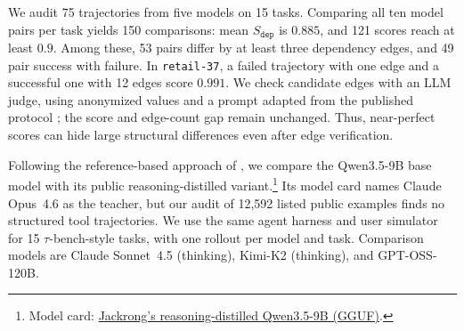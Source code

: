 We audit 75 trajectories from five models on 15 tasks. Comparing all ten
model pairs per task yields 150 comparisons: mean $S_{\mathtt{dep}}$ is
$0.885$, and 121 scores reach at least $0.9$. Among these, 53 pairs differ by at
least three dependency edges, and 49 pair success with failure. In
\texttt{retail-37}, a failed trajectory with one edge and a successful one
with 12 edges score $0.991$. We check candidate edges with an LLM judge,
using anonymized values and a prompt adapted from the published protocol
\citep[Appendix~B.1]{yang2026agents}; the score and edge-count gap remain
unchanged.
Thus, near-perfect scores can hide large structural differences even after
edge verification.

\label{sec:reasoning-distillation-convergence}
Following the reference-based approach of \citet{rawat2026reference}, we
compare the Qwen3.5-9B base model with its public reasoning-distilled
variant.\footnote{Model card:
\href{https://huggingface.co/Jackrong/Qwen3.5-9B-Claude-4.6-Opus-Reasoning-Distilled-v2-GGUF}{Jackrong's
reasoning-distilled Qwen3.5-9B (GGUF)}.}
Its model card names Claude Opus~4.6 as the teacher, but our audit of 12,592
listed public examples finds no structured tool trajectories. We use the
same agent harness and user simulator for 15 $\tau$-bench-style tasks,
with one rollout per model and task. Comparison models are Claude
Sonnet~4.5 (thinking), Kimi-K2 (thinking), and GPT-OSS-120B.

\begin{table}[!t]
    \centering
    \scriptsize
    \setlength{\tabcolsep}{2pt}
    \caption{Changes in AGS and its components after reasoning
    distillation on the same 15 tasks.
    Component values are rounded independently.}
    \label{tab:reasoning-distillation-similarity}
\end{table}


